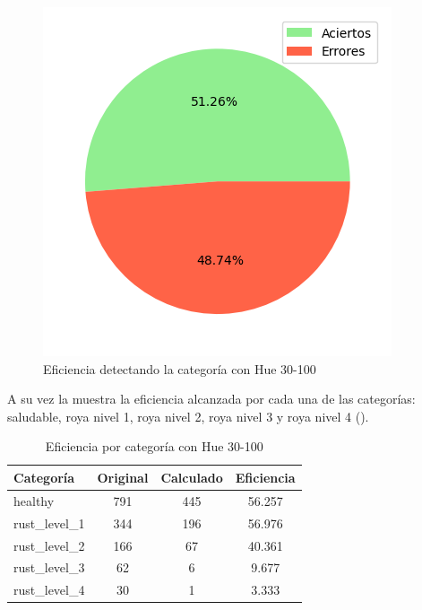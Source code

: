 \begin{figure}
\centering
\includegraphics[scale=0.6]{images/result_global_class_30_100.png}
\caption{Eficiencia detectando la categoría con Hue 30-100}
\label{img:efficiency_category_30_100}
\end{figure}

\captionsetup[figure]{skip=10pt}

A su vez la  muestra la eficiencia alcanzada por cada una de las categorías: saludable, roya nivel 1, roya nivel 2, roya nivel 3 y roya nivel 4 ().

\begin{table}[h!]
\centering
\begin{tabular}{|l|c|c|c|}
\hline 
\textbf{Categoría} & \textbf{Original} & \textbf{Calculado} & \textbf{Eficiencia} \\
\hline
healthy & 791 & 445 & 56.257 \\
\hline 
rust\_level\_1 & 344 & 196 & 56.976 \\
\hline 
rust\_level\_2 & 166 & 67 & 40.361 \\
\hline 
rust\_level\_3 & 62 & 6 & 9.677 \\
\hline 
rust\_level\_4 & 30 & 1 & 3.333 \\
\hline 
\end{tabular}
\caption{Eficiencia por categoría con Hue 30-100}
\label{table:efficiency_categories_30_100}
\end{table}

